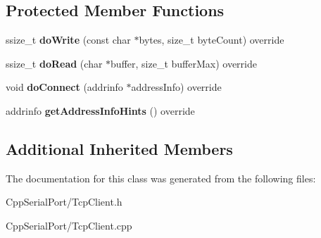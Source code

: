 \subsection*{Protected Member Functions}
\begin{DoxyCompactItemize}
\item 
\mbox{\label{class_cpp_serial_port_1_1_tcp_client_a2f8828127e62cd21e760624c9bd32311}} 
ssize\+\_\+t {\bfseries do\+Write} (const char $\ast$bytes, size\+\_\+t byte\+Count) override
\item 
\mbox{\label{class_cpp_serial_port_1_1_tcp_client_a35ce6d6bd181cd586863d0a7f7f48f5c}} 
ssize\+\_\+t {\bfseries do\+Read} (char $\ast$buffer, size\+\_\+t buffer\+Max) override
\item 
\mbox{\label{class_cpp_serial_port_1_1_tcp_client_aec9df600c145f1456e3b0ceb4374077d}} 
void {\bfseries do\+Connect} (addrinfo $\ast$address\+Info) override
\item 
\mbox{\label{class_cpp_serial_port_1_1_tcp_client_a4d5e2349357b375bf1ff88ea409fa574}} 
addrinfo {\bfseries get\+Address\+Info\+Hints} () override
\end{DoxyCompactItemize}
\subsection*{Additional Inherited Members}


The documentation for this class was generated from the following files\+:\begin{DoxyCompactItemize}
\item 
Cpp\+Serial\+Port/Tcp\+Client.\+h\item 
Cpp\+Serial\+Port/Tcp\+Client.\+cpp\end{DoxyCompactItemize}
